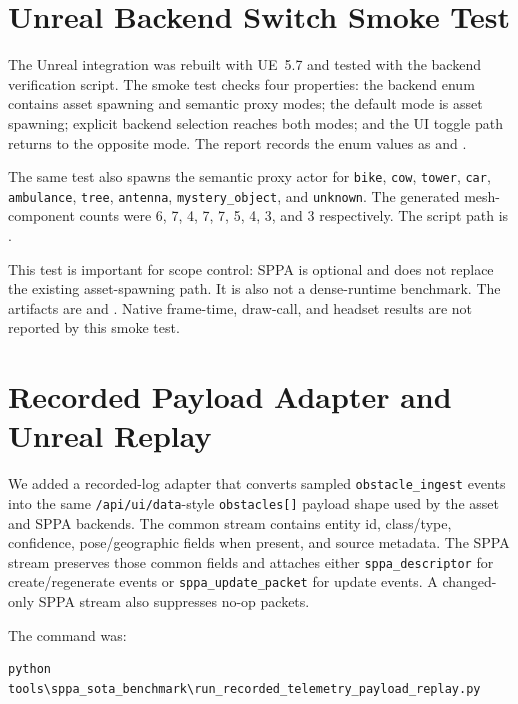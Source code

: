 ﻿\documentclass[11pt,a4paper]{article}
\begin{document}
\section{Unreal Backend Switch Smoke Test}

The Unreal integration was rebuilt with UE~5.7 and tested with the
backend verification script. The smoke test checks four properties: the
backend enum contains asset spawning and semantic proxy modes; the default mode
is asset spawning; explicit backend selection reaches both modes; and the UI
toggle path returns to the opposite mode. The report records the enum values as
 and .

The same test also spawns the semantic proxy actor for \texttt{bike},
\texttt{cow}, \texttt{tower}, \texttt{car}, \texttt{ambulance}, \texttt{tree},
\texttt{antenna}, \texttt{mystery\_object}, and \texttt{unknown}. The generated
mesh-component counts were 6, 7, 4, 7, 7, 5, 4, 3, and 3 respectively. The
script path is .

This test is important for scope control: SPPA is optional and does not replace
the existing asset-spawning path. It is also not a dense-runtime benchmark. The
artifacts are  and
. Native frame-time, draw-call,
and headset results are not reported by this smoke test.

\section{Recorded Payload Adapter and Unreal Replay}

We added a recorded-log adapter that converts sampled
\texttt{obstacle\_ingest} events into the same \texttt{/api/ui/data}-style
\texttt{obstacles[]} payload shape used by the asset and SPPA backends. The
common stream contains entity id, class/type, confidence, pose/geographic fields
when present, and source metadata. The SPPA stream preserves those common fields
and attaches either \texttt{sppa\_descriptor} for create/regenerate events or
\texttt{sppa\_update\_packet} for update events. A changed-only SPPA stream also
suppresses no-op packets.

The command was:

\begin{verbatim}
python tools\sppa_sota_benchmark\run_recorded_telemetry_payload_replay.py
\end{verbatim}
\end{document}
